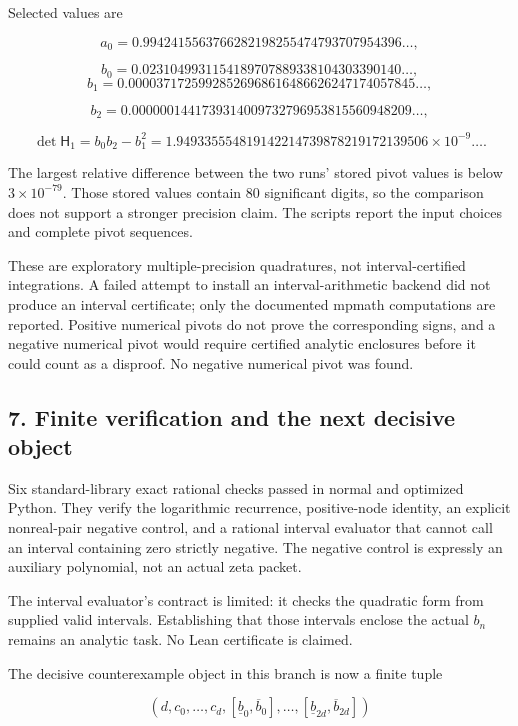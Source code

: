 Selected values are

\[
a_0=0.9942415563766282198255474793707954396\ldots,
\]

\[
b_0=0.0231049931154189707889338104303390140\ldots,
\]
\[
b_1=0.00003717259928526968616486626247174057845\ldots,
\]

\[
b_2=0.0000001441739314009732796953815560948209\ldots,
\]

\[
\det\mathsf H_1
=b_0b_2-b_1^2
=1.949335554819142214739878219172139506\times10^{-9}\ldots.
\]

The largest relative difference between the two runs' stored pivot
values is below \(3\times10^{-79}\). Those stored values contain 80
significant digits, so the comparison does not support a stronger
precision claim. The scripts report the input choices and complete pivot
sequences.

These are exploratory multiple-precision quadratures, not
interval-certified integrations. A failed attempt to install an
interval-arithmetic backend did not produce an interval certificate;
only the documented mpmath computations are reported. Positive numerical
pivots do not prove the corresponding signs, and a negative numerical
pivot would require certified analytic enclosures before it could count
as a disproof. No negative numerical pivot was found.

\subsection{7. Finite verification and the next decisive
object}\label{finite-verification-and-the-next-decisive-object}

Six standard-library exact rational checks passed in normal and
optimized Python. They verify the logarithmic recurrence, positive-node
identity, an explicit nonreal-pair negative control, and a rational
interval evaluator that cannot call an interval containing zero strictly
negative. The negative control is expressly an auxiliary polynomial, not
an actual zeta packet.

The interval evaluator's contract is limited: it checks the quadratic
form from supplied valid intervals. Establishing that those intervals
enclose the actual \(b_n\) remains an analytic task. No Lean certificate
is claimed.

The decisive counterexample object in this branch is now a finite tuple

\[
(d,c_0,\ldots,c_d,
[\underline b_0,\overline b_0],\ldots,
[\underline b_{2d},\overline b_{2d}])
\]

